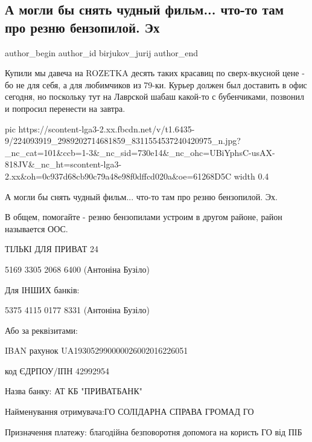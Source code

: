  
 
 
 
 
 
\subsection{А могли бы снять чудный фильм... что-то там про резню бензопилой. Эх}
\label{sec:27_07_2021.fb.birjukov_jurij.1.benzopila_cerkov_rozetka}
 
\ifcmt
 author_begin
   author_id birjukov_jurij
 author_end
\fi

Купили мы давеча на ROZETKA десять таких красавиц по сверх-вкусной цене - бо не
для себя, а для любимчиков из 79-ки. Курьер должен был доставить в офис
сегодня, но поскольку тут на Лаврской шабаш какой-то с бубенчиками, позвонил и
попросил перенести на завтра.

\ifcmt
  pic https://scontent-lga3-2.xx.fbcdn.net/v/t1.6435-9/224093919_2989202714681859_8311554537240420975_n.jpg?_nc_cat=101&ccb=1-3&_nc_sid=730e14&_nc_ohc=UBiYphsC-usAX-818JV&_nc_ht=scontent-lga3-2.xx&oh=0c937d68cb90c79a48e98f0dffcd020a&oe=61268D5C
  width 0.4
\fi

А могли бы снять чудный фильм... что-то там про резню бензопилой. Эх.

В общем, помогайте - резню бензопилами устроим в другом районе, район называется ООС.

ТІЛЬКІ ДЛЯ ПРИВАТ 24

5169 3305 2068 6400 (Антоніна Бузіло)

Для ІНШИХ банків:

5375  4115 0177 8331 (Антоніна Бузіло)

Або за реквізитами:

IBAN рахунок UA193052990000026002016226051

код ЄДРПОУ/ІПН 42992954

Назва банку: АТ КБ "ПРИВАТБАНК"

Найменування отримувача:ГО СОЛIДАРНА СПРАВА ГРОМАД ГО 

Призначення платежу:  благодійна безповоротня допомога на користь ГО від ПІБ


